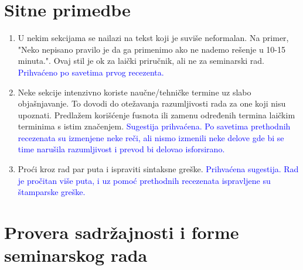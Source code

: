 \documentclass[a4paper]{report}
\newcommand{\odgovor}[1]{\textcolor{blue}{#1}}
\begin{document}
\section{Sitne primedbe}
\begin{enumerate}
\item U nekim sekcijama se nailazi na tekst koji je suviše neformalan. Na primer, "Neko nepisano pravilo je da ga primenimo ako ne nademo rešenje u 10-15 minuta.". Ovaj stil je ok za laički priručnik, ali ne za seminarski rad.
\odgovor{Prihvaćeno po savetima prvog recezenta.}
\item Neke sekcije intenzivno koriste naučne/tehničke termine uz slabo objašnjavanje. To dovodi do otežavanja razumljivosti rada za one koji nisu upoznati. Predlažem korišćenje fusnota ili zamenu određenih termina laičkim terminima s istim značenjem.
\odgovor{Sugestija prihvaćena. Po savetima prethodnih recezenata su izmenjene neke reči, ali nismo izmenili neke delove gde bi se time narušila razumljivost i prevod bi delovao isforsirano.}
\item Proći kroz rad par puta i ispraviti sintaksne greške.
\odgovor{Prihvaćena sugestija. Rad je pročitan više puta, i uz pomoć prethodnih recezenata ispravljene su štamparske greške.}
\end{enumerate}

\section{Provera sadržajnosti i forme seminarskog rada}
\end{document}

